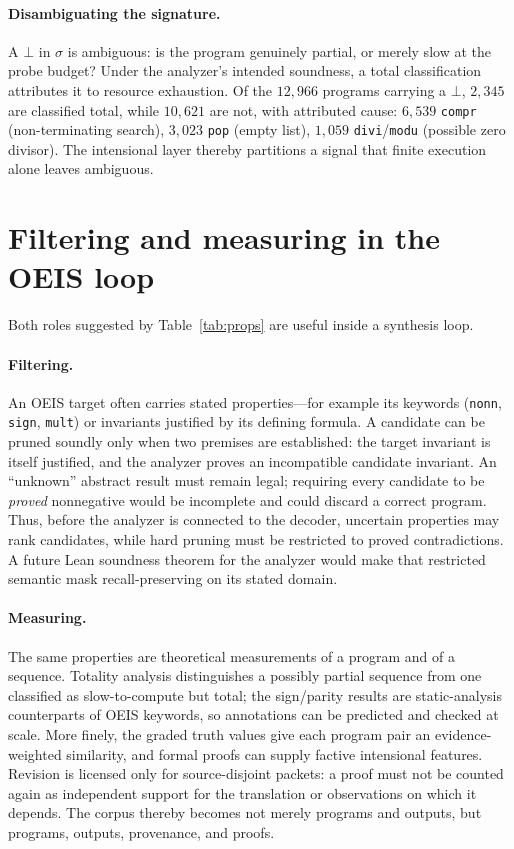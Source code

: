 \documentclass[11pt]{article}
\newcommand{\code}[1]{\texttt{#1}}
\newcommand{\sig}{\ensuremath{\sigma}}
\begin{document}
\paragraph{Disambiguating the signature.} A $\bot$ in \sig{} is ambiguous: is the program
genuinely partial, or merely slow at the probe budget? Under the analyzer's intended
soundness, a total classification attributes it to resource exhaustion. Of the $12{,}966$
programs carrying a $\bot$, $2{,}345$ are classified total, while $10{,}621$ are not, with
attributed cause: $6{,}539$ \code{compr} (non-terminating search), $3{,}023$ \code{pop}
(empty list), $1{,}059$ \code{divi}/\code{modu} (possible zero divisor). The intensional
layer thereby partitions a signal that finite execution alone leaves ambiguous.

\section{Filtering and measuring in the OEIS loop}
\label{sec:filter}

Both roles suggested by Table~\ref{tab:props} are useful inside a synthesis loop.

\paragraph{Filtering.} An OEIS target often carries stated properties---for example its
keywords (\code{nonn}, \code{sign}, \code{mult}) or invariants justified by its defining
formula. A candidate can be pruned soundly only when two premises are established: the
target invariant is itself justified, and the analyzer proves an incompatible candidate
invariant. An ``unknown'' abstract result must remain legal; requiring every candidate to
be \emph{proved} nonnegative would be incomplete and could discard a correct program.
Thus, before the analyzer is connected to the decoder, uncertain properties may rank
candidates, while hard pruning must be restricted to proved contradictions. A future Lean
soundness theorem for the analyzer would make that restricted semantic mask
recall-preserving on its stated domain.

\paragraph{Measuring.} The same properties are theoretical measurements of a program and of
a sequence. Totality analysis distinguishes a possibly partial sequence from one classified
as slow-to-compute but total; the sign/parity results are static-analysis counterparts of
OEIS keywords, so annotations can be predicted and checked at scale. More finely, the
graded truth values give each program pair an evidence-weighted similarity, and formal
proofs can supply factive intensional features. Revision is licensed only for
source-disjoint packets: a proof must not be counted again as independent support for the
translation or observations on which it depends. The corpus thereby becomes not merely
programs and outputs, but programs, outputs, provenance, and proofs.
\end{document}
